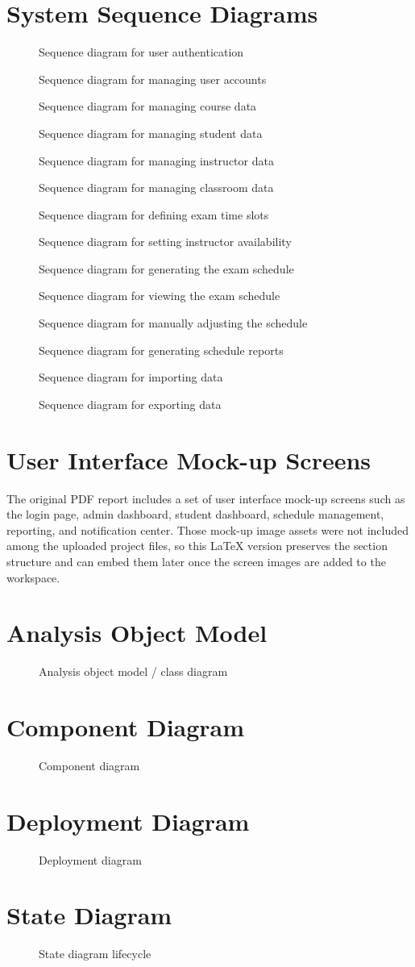 \documentclass[11pt]{report}
\newcommand{\diagramfigure}[3]{%
\begin{figure}[H]
\centering

\caption{#2}
\end{figure}
}
\begin{document}
\section{System Sequence Diagrams}
\diagramfigure{03_sequence_auth}{Sequence diagram for user authentication}{0.95}
\diagramfigure{04_sequence_manage_users}{Sequence diagram for managing user accounts}{0.95}
\diagramfigure{05_sequence_manage_courses}{Sequence diagram for managing course data}{0.95}
\diagramfigure{06_sequence_manage_students}{Sequence diagram for managing student data}{0.95}
\diagramfigure{07_sequence_manage_instructors}{Sequence diagram for managing instructor data}{0.95}
\diagramfigure{08_sequence_manage_classrooms}{Sequence diagram for managing classroom data}{0.95}
\diagramfigure{09_sequence_define_slots}{Sequence diagram for defining exam time slots}{0.95}
\diagramfigure{10_sequence_instructor_availability}{Sequence diagram for setting instructor availability}{0.95}
\diagramfigure{11_sequence_generate_schedule}{Sequence diagram for generating the exam schedule}{0.95}
\diagramfigure{12_sequence_view_schedule}{Sequence diagram for viewing the exam schedule}{0.95}
\diagramfigure{13_sequence_manual_adjust}{Sequence diagram for manually adjusting the schedule}{0.95}
\diagramfigure{14_sequence_generate_reports}{Sequence diagram for generating schedule reports}{0.95}
\diagramfigure{15_sequence_import_data}{Sequence diagram for importing data}{0.95}
\diagramfigure{16_sequence_export_data}{Sequence diagram for exporting data}{0.95}

\section{User Interface Mock-up Screens}
The original PDF report includes a set of user interface mock-up screens such as the login page, admin dashboard, student dashboard, schedule management, reporting, and notification center. Those mock-up image assets were not included among the uploaded project files, so this LaTeX version preserves the section structure and can embed them later once the screen images are added to the workspace.

\section{Analysis Object Model}
\diagramfigure{17_class_diagram_analysis}{Analysis object model / class diagram}{0.95}

\section{Component Diagram}
\diagramfigure{18_component_diagram}{Component diagram}{0.95}

\section{Deployment Diagram}
\diagramfigure{19_deployment_diagram}{Deployment diagram}{0.95}

\section{State Diagram}
\diagramfigure{20_state_diagram_lifecycle}{State diagram lifecycle}{0.8}
\end{document}
